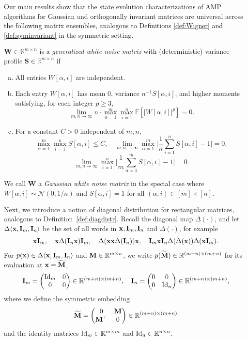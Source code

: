 \documentclass[10pt,reqno]{amsart}
\def\a{\alpha}
\def\W{\mathbf{W}}
\def\S{\mathbf{S}}
\def\E{\mathbb{E}}
\def\R{\mathbb{R}}
\def\Normal{\mathcal{N}}
\def\bx{\mathbf{x}}
\begin{document}
Our main results show that the state evolution characterizations of AMP
algorithms for Gaussian and orthogonally invariant matrices are
universal across the following matrix ensembles, analogous to
Definitions \ref{def:Wigner} and \ref{def:syminvariant} in the symmetric
setting.

\begin{definition}\label{def:rect}
$\W \in \R^{m \times n}$ is a \emph{generalized white noise matrix} with
(deterministic) variance profile $\S \in \R^{m \times n}$ if
\begin{enumerate}[(a)]
\item All entries $W[\a,i]$ are independent.
\item Each entry $W[\a,i]$ has mean 0, variance $n^{-1}S[\a,i]$, and higher moments
satisfying, for each integer $p \geq 3$,
\[\lim_{m,n \to \infty} n \cdot \max_{\a=1}^m \max_{i=1}^n \E[|W[\a,i]|^p]=0.\]
\item For a constant $C>0$ independent of $m,n$,
\[\max_{\a=1}^m \max_{i=1}^n S[\a,i] \leq C, \quad
\lim_{m,n \to \infty} \max_{\a=1}^m \bigg|\frac{1}{n}\sum_{i=1}^n S[\a,i]-1\bigg|
=0,\]
\[
\lim_{m,n \to \infty} \max_{i=1}^n \bigg|\frac{1}{m}\sum_{\a=1}^m S[\a,i]-1\bigg|
=0.\]
\end{enumerate}
We call $\W$ a \emph{Gaussian white noise matrix} in the special case
where $W[\a,i] \sim \Normal(0,1/n)$ and $S[\a,i]=1$ for all 
$(\alpha,i) \in [m] \times [n]$.
\end{definition}

Next, we introduce a notion of diagonal distribution for rectangular
matrices, analogous to Definition~\ref{def:diagdistr}. 
Recall the diagonal map $\Delta(\cdot)$,
and let $\Delta\langle\bx, \bI_m, \bI_n\rangle$ be the set of all words in 
$\bx, \bI_m, \bI_n$ and $\Delta(\cdot)$, for example
\[\bx\bI_m, \quad \bx\Delta(\bI_n\bx)\bI_m,
\quad \Delta(\bx\bx\Delta(\bI_n))\bx,
\quad \bI_m\bx\bI_n\Delta(\Delta(\bx))\Delta(\bx\bI_m).\]
For $p(\bx)\in\Delta\langle\bx,\bI_m,\bI_n\rangle$ and $\mathbf{M}\in\mathbb{R}^{m\times n}$,
we write $p(\widetilde{\mathbf{M}}) \in \mathbb{R}^{(m+n)\times(m+n)}$ for its evaluation at
$\bx=\widetilde\bM$,
	\[\mathbf{I}_m=\begin{pmatrix} \mathrm{Id}_m & 0 \\ 0 & 0 \end{pmatrix}
\in \mathbb{R}^{(m+n)\times(m+n)}, \quad
\mathbf{I}_n=\begin{pmatrix} 0 & 0 \\ 0 & \mathrm{Id}_n \end{pmatrix} \in
\mathbb{R}^{(m+n)\times(m+n)},\]
where we define the symmetric embedding
\begin{equation}\label{eq:Membedding}
	\widetilde{\mathbf{M}} = \begin{pmatrix}
		0 & \mathbf{M}\\
		\mathbf{M}^\top & 0
	\end{pmatrix} \in \mathbb{R}^{(m+n)\times(m+n)}
\end{equation}
and the identity matrices $\Id_m \in \R^{m \times m}$ and $\Id_n \in \R^{n
\times n}$.
\end{document}
